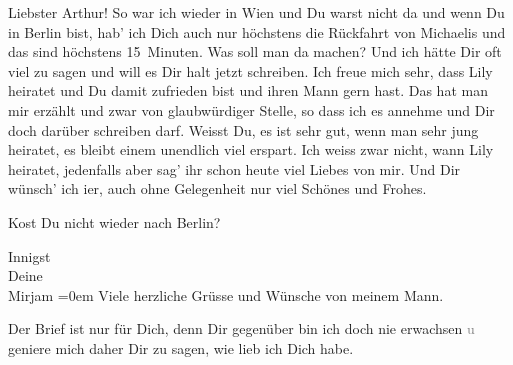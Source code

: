 \pstart{}Liebster Arthur!\pend\vspace{0.5em}
\pstart
           So war ich wieder in Wien und Du warst nicht da
               und wenn Du in Berlin bist, hab’ ich Dich auch
               nur höchstens die Rückfahrt von Michaelis und das sind höchstens 15 Minuten. Was soll man da machen? Und ich
               hätte Dir oft viel zu sagen und will es Dir halt jetzt schreiben. Ich freue {\pb}mich sehr, dass Lily heiratet und Du damit zufrieden bist und ihren Mann gern hast. Das hat man
               mir erzählt und zwar von glaubwürdiger Stelle, so dass ich es annehme und Dir doch
               darüber schreiben darf. Weisst Du, es ist sehr gut, wenn man sehr jung heiratet, es
               bleibt einem unendlich viel erspart. Ich weiss zwar nicht, wann Lily heiratet, jedenfalls {\pb}aber sag’ ihr schon heute viel
               Liebes von mir. Und Dir wünsch’ ich i{\geminationm}er, auch ohne
               Gelegenheit nur viel Schönes und Frohes.\pend
           
\pstart
           Ko{\geminationm}st Du nicht wieder nach Berlin?\pend
           
\pstart
           Innigst{\\[\baselineskip]}Deine{\\[\baselineskip]}\spacefill\mbox{Mirjam}\pend
           \leftskip=0em{}
\pstart
           \noindent{}Viele herzliche Grüsse und Wünsche von meinem Mann.\pend
           
\pstart
           Der Brief ist nur für Dich, denn Dir gegenüber bin ich doch nie erwachsen
                     \textcolor{gray}{u} geniere mich daher Dir zu sagen, wie lieb ich Dich
                  habe.\pend
           \endnumbering{}  \newcommand{\dateiname}{L02488}\newcommand{\titel}{Mirjam Beer-Hofmann an Arthur Schnitzler, 8. 6. 1927}\newcommand{\editorInnen}{Martin Anton Müller und Gerd-Hermann Susen}
